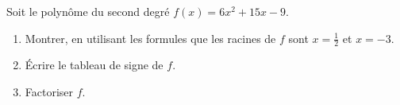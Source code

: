 
\begin{exercice}\label{exosmath-0092}

    Soit le polynôme du second degré \( f(x)=6x^2+15x-9\).
    \begin{enumerate}
        \item
            Montrer, en utilisant les formules que les racines de \( f\) sont \( x=\frac{ 1 }{2}\) et \( x=-3\).
        \item
            Écrire le tableau de signe de \( f\).
        \item
            Factoriser \( f\).
    \end{enumerate}

\end{exercice}
